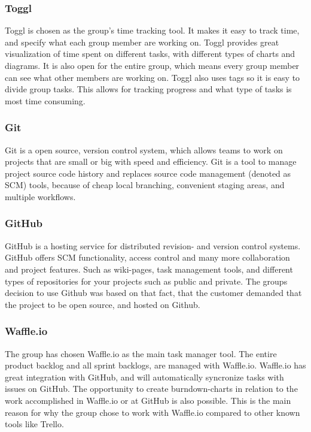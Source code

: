\subsubsection{Toggl}
Toggl \cite{Toggl} is chosen as the group's time tracking tool. It makes it easy to track time, and specify what each group member are working on. Toggl provides great visualization of time spent on different tasks, with different types of charts and diagrams. It is also open for the entire group, which means every group member can see what other members are working on. Toggl also uses tags so it is easy to divide group tasks. This allows for tracking progress and what type of tasks is most time consuming.

\subsubsection{Git}
Git \cite{Git} is a open source, version control system, which allows teams to work on projects that are small or big with speed and efficiency. Git is a tool to manage project source code history and replaces source code management (denoted as SCM)  tools, because of cheap local branching, convenient staging areas, and multiple workflows.

\subsubsection{GitHub}
\label{GitHub}
GitHub\cite{GitHub} is a hosting service for distributed revision- and version control systems. GitHub offers SCM functionality, access control and many more collaboration and project features. Such as wiki-pages, task management tools, and different types of repositories for your projects such as public and private. The groups decision to use Github was based on that fact, that the customer demanded that the project to be open source, and hosted on Github. 

\subsubsection{Waffle.io}
\label{Waffle.io}
The group has chosen Waffle.io \cite{Waffle} as the main task manager tool. The entire product backlog and all sprint backlogs, are managed with Waffle.io. Waffle.io has great integration with GitHub, and will automatically syncronize tasks with issues on GitHub. The opportunity to create burndown-charts in relation to the work accomplished in Waffle.io or at GitHub is also possible. This is the main reason for why the group chose to work with Waffle.io compared to other known tools like Trello.

